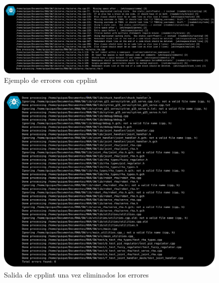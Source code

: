     \begin{figure}[H]
    	\centering
    	\includegraphics[width=1\textwidth]{figuras/Imagenes_SW/test/ReadibilityTest_2.jpg}
    	\caption{Ejemplo de errores con cpplint}
    	\label{fig:SW:test:error_output_cpplint}
    \end{figure}

    \begin{figure}[H]
    	\centering
    	\includegraphics[width=1\textwidth]{figuras/Imagenes_SW/test/ReadibilityTest_3.jpg}
    	\caption{Salida de cpplint una vez eliminados los errores}
    	\label{fig:SW:test:cpplint_ok}
    \end{figure}
